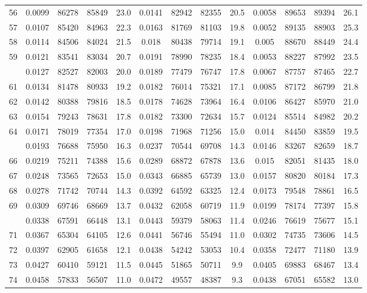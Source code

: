 \documentclass[
  14pt,
]{article}
\begin{document}
\begin{longtable}[t]{lcccccccccccc}
56 & 0.0099 & 86278 & 85849 & 23.0 & 0.0141 & 82942 & 82355 & 20.5 & 0.0058 & 89653 & 89394 & 26.1\\
57 & 0.0107 & 85420 & 84963 & 22.3 & 0.0163 & 81769 & 81103 & 19.8 & 0.0052 & 89135 & 88903 & 25.3\\
58 & 0.0114 & 84506 & 84024 & 21.5 & 0.018 & 80438 & 79714 & 19.1 & 0.005 & 88670 & 88449 & 24.4\\
59 & 0.0121 & 83541 & 83034 & 20.7 & 0.0191 & 78990 & 78235 & 18.4 & 0.0053 & 88227 & 87992 & 23.5\\
\addlinespace
60 & 0.0127 & 82527 & 82003 & 20.0 & 0.0189 & 77479 & 76747 & 17.8 & 0.0067 & 87757 & 87465 & 22.7\\
61 & 0.0134 & 81478 & 80933 & 19.2 & 0.0182 & 76014 & 75321 & 17.1 & 0.0085 & 87172 & 86799 & 21.8\\
62 & 0.0142 & 80388 & 79816 & 18.5 & 0.0178 & 74628 & 73964 & 16.4 & 0.0106 & 86427 & 85970 & 21.0\\
63 & 0.0154 & 79243 & 78631 & 17.8 & 0.0182 & 73300 & 72634 & 15.7 & 0.0124 & 85514 & 84982 & 20.2\\
64 & 0.0171 & 78019 & 77354 & 17.0 & 0.0198 & 71968 & 71256 & 15.0 & 0.014 & 84450 & 83859 & 19.5\\
\addlinespace
65 & 0.0193 & 76688 & 75950 & 16.3 & 0.0237 & 70544 & 69708 & 14.3 & 0.0146 & 83267 & 82659 & 18.7\\
66 & 0.0219 & 75211 & 74388 & 15.6 & 0.0289 & 68872 & 67878 & 13.6 & 0.015 & 82051 & 81435 & 18.0\\
67 & 0.0248 & 73565 & 72653 & 15.0 & 0.0343 & 66885 & 65739 & 13.0 & 0.0157 & 80820 & 80184 & 17.3\\
68 & 0.0278 & 71742 & 70744 & 14.3 & 0.0392 & 64592 & 63325 & 12.4 & 0.0173 & 79548 & 78861 & 16.5\\
69 & 0.0309 & 69746 & 68669 & 13.7 & 0.0432 & 62058 & 60719 & 11.9 & 0.0199 & 78174 & 77397 & 15.8\\
\addlinespace
70 & 0.0338 & 67591 & 66448 & 13.1 & 0.0443 & 59379 & 58063 & 11.4 & 0.0246 & 76619 & 75677 & 15.1\\
71 & 0.0367 & 65304 & 64105 & 12.6 & 0.0441 & 56746 & 55494 & 11.0 & 0.0302 & 74735 & 73606 & 14.5\\
72 & 0.0397 & 62905 & 61658 & 12.1 & 0.0438 & 54242 & 53053 & 10.4 & 0.0358 & 72477 & 71180 & 13.9\\
73 & 0.0427 & 60410 & 59121 & 11.5 & 0.0445 & 51865 & 50711 & 9.9 & 0.0405 & 69883 & 68467 & 13.4\\
74 & 0.0458 & 57833 & 56507 & 11.0 & 0.0472 & 49557 & 48387 & 9.3 & 0.0438 & 67051 & 65582 & 13.0\\

\end{longtable}
\end{document}
